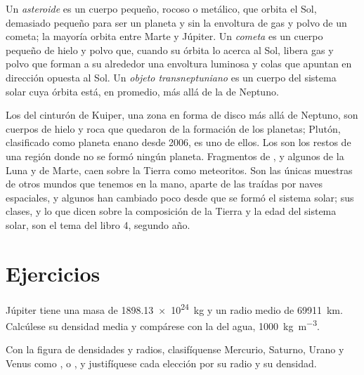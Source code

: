 \begin{definition}\label{def:b1:comparative-planetology:small-bodies}
Un \emph{asteroide} es un cuerpo pequeño, rocoso o metálico, que orbita el Sol,
demasiado pequeño para ser un planeta y sin la envoltura de gas y polvo de un cometa; la mayoría
orbita entre Marte y Júpiter. Un \emph{cometa} es un cuerpo pequeño de hielo y
polvo que, cuando su órbita lo acerca al Sol, libera gas y polvo que forman a su alrededor una
envoltura luminosa y colas que apuntan en dirección opuesta al Sol. Un \emph{objeto
transneptuniano} es un cuerpo del sistema solar cuya órbita está,
en promedio, más allá de la de Neptuno.
\end{definition}

Los  del cinturón de Kuiper, una zona en forma de disco más allá de
Neptuno, son cuerpos de hielo y roca que quedaron de la formación de los planetas; Plutón,
clasificado como planeta enano desde 2006, es uno de ellos. Los  son los restos de una
región donde no se formó ningún planeta. Fragmentos de , y algunos de la Luna y de Marte,
caen sobre la Tierra como meteoritos. Son las únicas muestras de otros mundos que tenemos en la
mano, aparte de las traídas por naves espaciales, y algunos han cambiado poco desde que se formó
el sistema solar; sus clases, y lo que dicen sobre la composición de la Tierra y la edad del sistema
solar, son el tema del libro 4, segundo año.

\section{Ejercicios}

\begin{exercise}[$\star$]\label{exo:b1:comparative-planetology:1}
Júpiter tiene una masa de \qty{1898.13e24}{kg} y un radio medio de \qty{69911}{km}. Calcúlese
su densidad media y compárese con la del agua, \qty{1000}{kg.m^{-3}}.
\end{exercise}

\begin{exercise}[$\star$]\label{exo:b1:comparative-planetology:2}
Con la figura de densidades y radios, clasifíquense Mercurio, Saturno, Urano y Venus como
,  o , y justifíquese cada elección por su
radio y su densidad.
\end{exercise}


